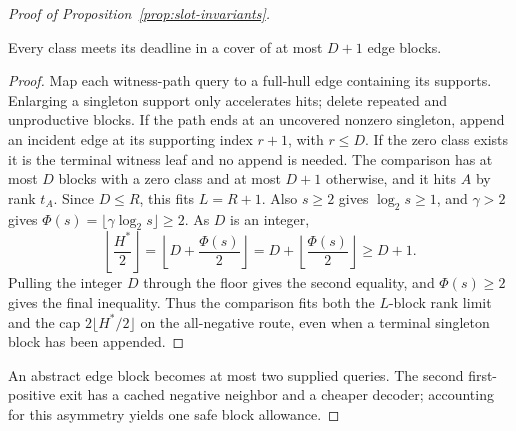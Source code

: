 \begin{proof}[Proof of Proposition~\ref{prop:slot-invariants}]
\begin{claim}
\label{clm:slot-total-caps}
Every class meets its deadline in a cover of at most $D+1$ edge blocks.
\end{claim}
\begin{proof}
Map each witness-path query to a full-hull edge containing its
supports. Enlarging a singleton support only accelerates hits; delete
repeated and unproductive blocks. If the path ends at an uncovered
nonzero singleton, append an incident edge at its supporting index
$r+1$, with $r\le D$. If the zero class exists it is the terminal
witness leaf and no append is needed. The comparison has at most $D$
blocks with a zero class and at most $D+1$ otherwise, and it hits
$A$ by rank $t_A$. Since $D\le R$, this fits $L=R+1$.
Also $s\ge2$ gives $\log_2s\ge1$, and $\gamma>2$ gives
$\Phi(s)=\lfloor\gamma\log_2s\rfloor\ge2$. As $D$ is
an integer,
\[
 \left\lfloor\frac{H^*}{2}\right\rfloor
 =\left\lfloor D+\frac{\Phi(s)}2\right\rfloor
 =D+\left\lfloor\frac{\Phi(s)}2\right\rfloor\ge D+1.
\]
Pulling the integer $D$ through the floor gives the second equality,
and $\Phi(s)\ge2$ gives the final inequality.
Thus the comparison fits both the $L$-block rank limit and the cap
$2\lfloor H^*/2\rfloor$ on the all-negative route, even when a
terminal singleton block has been appended.
\end{proof}
An abstract edge block becomes at most two supplied queries. The
second first-positive exit has a cached negative neighbor and a cheaper
decoder; accounting for this asymmetry yields one safe block allowance.


\end{proof}
